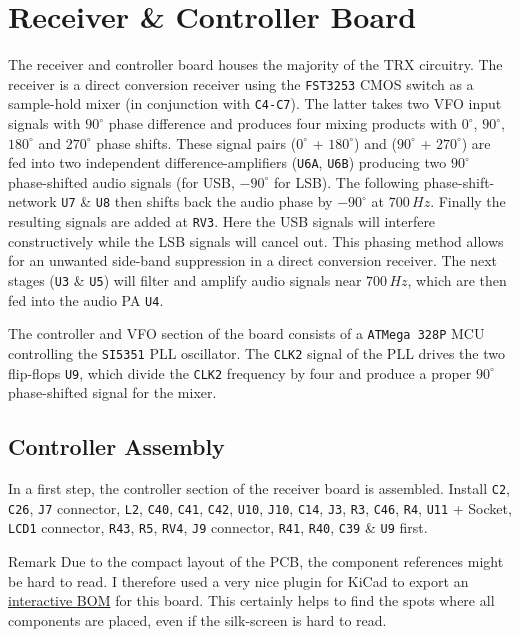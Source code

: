 \documentclass[10pt, a4paper,twoside]{scrartcl}
\newenvironment{remark}{\begin{bclogo}[couleur=blue!30,arrondi=.1,logo=\bcinfo,ombre=true]{Remark}}{\end{bclogo}}
\begin{document}
\section{Receiver \& Controller Board} \label{sec:rx}
 The receiver and controller board houses the majority of the TRX circuitry. The receiver is a direct conversion receiver using the \texttt{FST3253} CMOS switch as a sample-hold mixer (in conjunction with \texttt{C4-C7}). The latter takes two VFO input signals with $90^\circ$ phase difference and produces four mixing products with $0^\circ$, $90^\circ$, $180^\circ$ and $270^\circ$ phase shifts. These signal pairs ($0^\circ$ + $180^\circ$) and ($90^\circ$ + $270^\circ$) are fed into two independent difference-amplifiers (\texttt{U6A}, \texttt{U6B}) producing two $90^\circ$ phase-shifted audio signals (for USB, $-90^\circ$ for LSB). The following phase-shift-network \texttt{U7} \& \texttt{U8} then shifts back the audio phase by $-90^\circ$ at $700\,Hz$. Finally the resulting signals are added at \texttt{RV3}. Here the USB signals will interfere constructively while the LSB signals will cancel out. This phasing method allows for an unwanted side-band suppression in a direct conversion receiver. The next stages (\texttt{U3} \& \texttt{U5}) will filter and amplify audio signals near $700\,Hz$, which are then fed into the audio PA \texttt{U4}. 
 
 The controller and VFO section of the board consists of a \texttt{ATMega 328P} MCU controlling the \texttt{SI5351} PLL oscillator. The \texttt{CLK2} signal of the PLL drives the two flip-flops \texttt{U9}, which divide the \texttt{CLK2} frequency by four and produce a proper $90^\circ$ phase-shifted signal for the mixer.
 
\subsection{Controller Assembly}
 In a first step, the controller section of the receiver board is assembled. Install \texttt{C2}, \texttt{C26}, \texttt{J7} connector, \texttt{L2}, \texttt{C40}, \texttt{C41}, \texttt{C42}, \texttt{U10}, \texttt{J10}, \texttt{C14}, \texttt{J3}, \texttt{R3}, \texttt{C46}, \texttt{R4}, \texttt{U11} + Socket, \texttt{LCD1} connector, \texttt{R43}, \texttt{R5}, \texttt{RV4}, \texttt{J9} connector, \texttt{R41}, \texttt{R40}, \texttt{C39} \& \texttt{U9} first. 

\begin{remark}
 Due to the compact layout of the PCB, the component references might be hard to read. I therefore used a very nice plugin for KiCad to export an \href{https://dm3mat.darc.de/cw2019/rx_rev2_ibom.html}{interactive BOM} for this board. This certainly helps to find the spots where all components are placed, even if the silk-screen is hard to read.
\end{remark}
\end{document}
